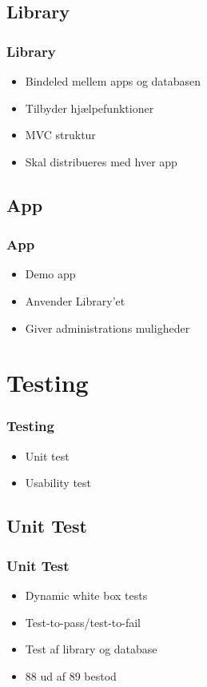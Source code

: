 \documentclass{beamer}
\begin{document}
\subsection{Library}

\begin{frame}
	\frametitle{Library}
	\begin{itemize}
		\item Bindeled mellem apps og databasen
		\item Tilbyder hj\ae{}lpefunktioner
		\item MVC struktur
		\item Skal distribueres med hver app
	\end{itemize}
\end{frame}

\subsection{App}

\begin{frame}
	\frametitle{App}
	\begin{itemize}
		\item Demo app
		\item Anvender Library'et
		\item Giver administrations muligheder
	\end{itemize}
\end{frame}

\section{Testing}

\begin{frame}
	\frametitle{Testing}
	\begin{itemize}
		\item Unit test
		\item Usability test
	\end{itemize}
\end{frame}

\subsection{Unit Test}

\begin{frame}
	\frametitle{Unit Test}
	\begin{itemize}
		\item Dynamic white box tests
		\item Test-to-pass/test-to-fail
		\item Test af library og database
		\item 88 ud af 89 bestod
	\end{itemize}
\end{frame}
\end{document}

